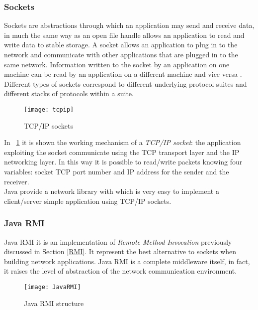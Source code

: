\subsubsection{Sockets} \label{socket} Sockets are abstractions through which an application may send and receive data, in much the same way as an open file handle allows an application to read and write data to stable storage.
A socket allows an application to plug in to the network and communicate with other applications that are plugged in to the same network. Information written to the socket by
an application on one machine can be read by an application on a different machine and vice versa \cite{calvert2011tcp}.
Different types of sockets correspond to different underlying protocol suites and different
stacks of protocols within a suite.
\begin{figure}[h]
	\centering
	\texttt{[image: tcpip]}
	\caption{TCP/IP sockets}
	\label{fig:2.15}
\end{figure}
In \figurename~\ref{fig:2.15} it is shown the working mechanism of a \textit{TCP/IP socket}: the application exploiting the socket communicate using the TCP transport layer and the IP networking layer. In this way it is possible to read/write packets knowing four variables: socket TCP port number and IP address for the sender and the receiver.\\
Java provide a network library with which is very easy to implement a client/server simple application using TCP/IP sockets. 
%
%

\subsubsection{Java RMI} Java RMI it is an implementation of \textit{Remote Method Invocation} previously discussed in Section \ref{RMI}. It represent the best alternative to sockets when building network applications. Java RMI is a complete middleware itself, in fact, it raises the level of abstraction of the network communication environment.
\begin{figure}[h]
	\centering
	\texttt{[image: JavaRMI]}
	\caption{Java RMI structure}
	\label{fig:2.16}
\end{figure}

